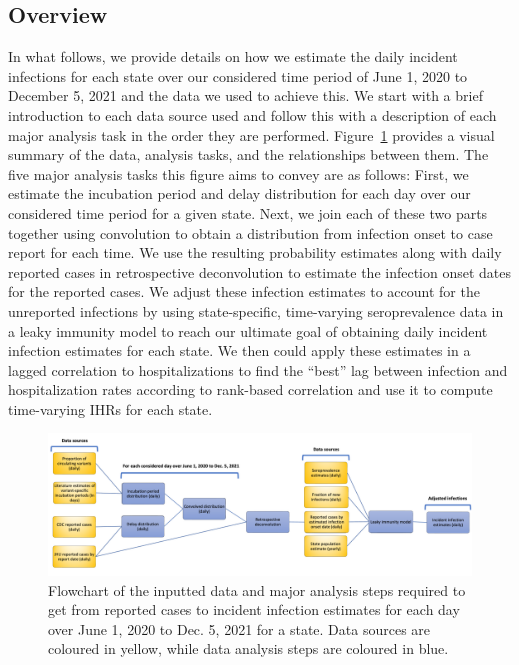 \documentclass{article}
\begin{document}
\subsection{Overview} 
In what follows, we provide details on how we estimate the daily incident infections for each state over our considered time period of June 1, 2020 to December 5, 2021 and the data we used to achieve this. We start with a brief introduction to each data source used and follow this with a description of each major analysis task in the order they are performed. Figure~\ref{fig:cases_to_infect_flowchart} provides a visual summary of the data, analysis tasks, and the relationships between them. The five major analysis tasks this figure aims to convey are as follows: First, we estimate the incubation period and delay distribution for each day over our considered time period for a given state. Next, we join each of these two parts together using convolution to obtain a distribution from infection onset to case report for each time. We use the resulting probability estimates along with daily reported cases in retrospective deconvolution to estimate the infection onset dates for the reported cases. We adjust these infection estimates to account for the unreported infections by using state-specific, time-varying seroprevalence data in a leaky immunity model to reach our ultimate goal of obtaining daily incident infection estimates for each state. We then could apply these estimates in a lagged correlation to hospitalizations to find the ``best'' lag between infection and hospitalization rates according to rank-based correlation and use it to compute time-varying IHRs for each state. 


\begin{figure}[!tb]
\centering
    \includegraphics[width=.99\textwidth]{Reported_cases_to_infect_flowchart.pdf} 
    \caption{Flowchart of the inputted data and major analysis steps required to get from reported cases to incident infection estimates for each day over June 1, 2020 to Dec. 5, 2021 for a state. Data sources are coloured in yellow, while data analysis steps are coloured in blue.}
    \label{fig:cases_to_infect_flowchart}
\end{figure}
\end{document}
